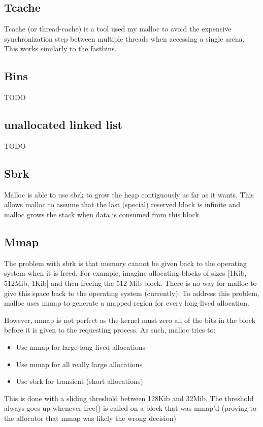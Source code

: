 \subsection{Tcache}
Tcache (or thread-cache) is a tool used my malloc to avoid the expensive synchronization step between multiple threads when accessing a single arena. This works similarly to the fastbins.

\subsection{Bins}
TODO
\subsection{unallocated linked list}
TODO
\subsection{Sbrk}
Malloc is able to use sbrk to grow the heap contiguously as far as it wants. This allows malloc to assume that the last (special) reserved block is infinite and malloc grows the stack when data is consumed from this block. 

\subsection{Mmap}
The problem with sbrk is that memory cannot be given back to the operating system when it is freed. For example, imagine allocating blocks of sizes [1Kib, 512Mib, 1Kib] and then freeing the 512 Mib block. There is no way for malloc to give this space back to the operating system (currently). To address this problem, malloc uses mmap to generate a mapped region for every long-lived allocation. 

However, mmap is not perfect as the kernel must zero all of the bits in the block before it is given to the requesting process. As such, malloc tries to:
\begin{itemize}
  \item Use mmap for large long lived allocations 
  \item Use mmap for all really large allocations 
  \item Use sbrk for transient (short allocations)
\end{itemize}

This is done with a sliding threshold between 128Kib and 32Mib. The threshold always goes up whenever free() is called on a block that was mmap'd (proving to the allocator that mmap was likely the wrong decision)

 


